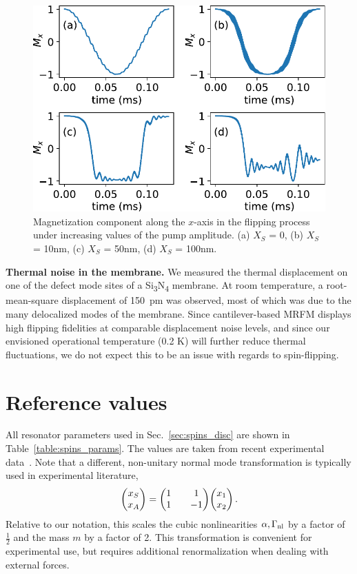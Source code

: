 \begin{figure}
	\centering
	\includegraphics[width=0.65\columnwidth]{figures/spins/fig6_revised.pdf}
	\caption{Magnetization component along the $x$-axis in the flipping process under increasing values of the pump amplitude. (a) $X_S$ = 0, (b) $X_S$ = 10\;nm, (c) $X_S$ = 50\;nm, (d) $X_S$ = 100\;nm.}
	\label{fig:flips}
\end{figure}

\textbf{Thermal noise in the membrane.} We measured the thermal displacement on one of the defect mode sites of a Si\textsubscript{3}N\textsubscript{4} membrane. At room temperature, a root-mean-square displacement of 150~pm was observed, most of which was due to the many delocalized modes of the membrane. Since cantilever-based MRFM displays high flipping fidelities at comparable displacement noise levels, and since our envisioned operational temperature (0.2 K) will further reduce thermal fluctuations, we do not expect this to be an issue with regards to spin-flipping.
\\

\section{Reference values} \label{app:vals}
All resonator parameters used in Sec.~\ref{sec:spins_disc} are shown in Table~\ref{table:spins_params}. The values are taken from recent experimental data~\cite{Catalini_2020}. Note that a different, non-unitary normal mode transformation is typically used in experimental literature,
\begin{equation}
\mqty(x_S \\ x_A) = \mqty(1 && 1 \\ 1 && -1) \mqty(x_1 \\ x_2)\,. 
\end{equation}
Relative to our notation, this scales the cubic nonlinearities $\alpha, \Gamma_{\rm nl}$ by a factor of $\frac{1}{2}$ and the mass $m$ by a factor of 2. This transformation is convenient for experimental use, but requires additional renormalization when dealing with external forces.

